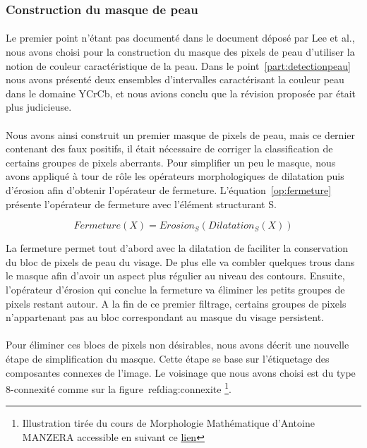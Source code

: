 \documentclass[11pt, french,screen]{report-rd-info}
\begin{document}
\subsubsection{Construction du masque de peau}
\paragraph*{}
Le premier point n'étant pas documenté dans le document déposé par Lee et al., nous avons choisi pour la construction du masque des pixels de peau d'utiliser la notion de couleur caractéristique de la peau. Dans le point~\ref{part:detectionpeau} nous avons présenté deux ensembles d'intervalles caractérisant la couleur peau dans le domaine YCrCb, et nous avions conclu que la révision proposée par \cite{Kukharev2004} était plus judicieuse.

\paragraph*{}
Nous avons ainsi construit un premier masque de pixels de peau, mais ce dernier contenant des faux positifs, il était nécessaire de corriger la classification de certains groupes de pixels aberrants. Pour simplifier un peu le masque, nous avons appliqué à tour de rôle les opérateurs morphologiques de dilatation puis d'érosion afin d'obtenir l'opérateur de fermeture. L'équation~\ref{op:fermeture} présente l'opérateur de fermeture avec l'élément structurant S.

\begin{equation}
Fermeture(X) = Erosion_S(Dilatation_S(X))
\label{op:fermeture}
\end{equation}

La fermeture permet tout d'abord avec la dilatation de faciliter la conservation du bloc de pixels de peau du visage. De plus elle va combler quelques trous dans le masque afin d'avoir un aspect plus régulier au niveau des contours. Ensuite, l'opérateur d'érosion qui conclue la fermeture va éliminer les petits groupes de pixels restant autour. A la fin de ce premier filtrage, certains groupes de pixels n'appartenant pas au bloc correspondant au masque du visage persistent.

\paragraph*{}
Pour éliminer ces blocs de pixels non désirables, nous avons décrit une nouvelle étape de simplification du masque. Cette étape se base sur l'étiquetage des composantes connexes de l'image. Le voisinage que nous avons choisi est du type 8-connexité comme sur la figure~ref{diag:connexite} \footnote{Illustration tirée du cours de Morphologie Mathématique d'Antoine MANZERA accessible en suivant ce \href{https://www.google.fr/url?sa=t&rct=j&q=&esrc=s&source=web&cd=5&cad=rja&ved=0CFAQFjAE&url=http\%3A\%2F\%2Fwwwdfr.ensta.fr\%2FCours\%2Fdocs\%2FESE42\%2FEse4_chap4.pdf&ei=QnD7UobSCom10wWJ6YFo&usg=AFQjCNH4V0RA2P8KrsXDAYVEat60hdGgng&sig2=sqagrklYfjkCL5fLUTMIog}{lien}}.
\end{document}
